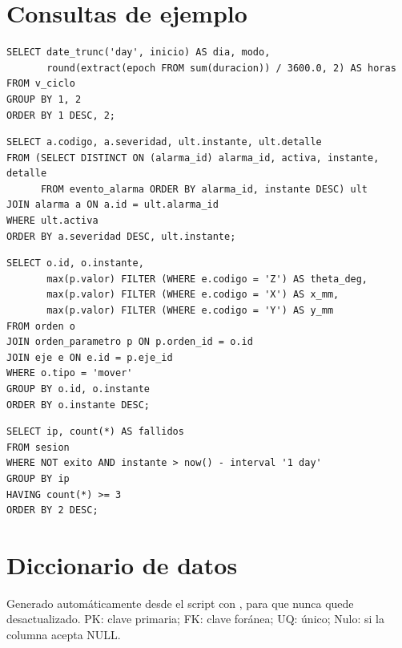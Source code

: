 \documentclass[a4paper,11pt]{article}
\begin{document}
\section{Consultas de ejemplo}\label{sec:consultas}

\begin{lstlisting}[style=sql, caption={Tiempo encendido por día y por modo (consulta 2).}]
SELECT date_trunc('day', inicio) AS dia, modo,
       round(extract(epoch FROM sum(duracion)) / 3600.0, 2) AS horas
FROM v_ciclo
GROUP BY 1, 2
ORDER BY 1 DESC, 2;
\end{lstlisting}

\begin{lstlisting}[style=sql, caption={Alarmas activas en este momento (consulta 11).}]
SELECT a.codigo, a.severidad, ult.instante, ult.detalle
FROM (SELECT DISTINCT ON (alarma_id) alarma_id, activa, instante, detalle
      FROM evento_alarma ORDER BY alarma_id, instante DESC) ult
JOIN alarma a ON a.id = ult.alarma_id
WHERE ult.activa
ORDER BY a.severidad DESC, ult.instante;
\end{lstlisting}

\begin{lstlisting}[style=sql, caption={La 1FN se deshace solo al mostrar: destinos de cada orden en una fila (consulta 14).}]
SELECT o.id, o.instante,
       max(p.valor) FILTER (WHERE e.codigo = 'Z') AS theta_deg,
       max(p.valor) FILTER (WHERE e.codigo = 'X') AS x_mm,
       max(p.valor) FILTER (WHERE e.codigo = 'Y') AS y_mm
FROM orden o
JOIN orden_parametro p ON p.orden_id = o.id
JOIN eje e ON e.id = p.eje_id
WHERE o.tipo = 'mover'
GROUP BY o.id, o.instante
ORDER BY o.instante DESC;
\end{lstlisting}

\begin{lstlisting}[style=sql, caption={Seguridad: IP con tres o más ingresos fallidos en el último día (consulta 10).}]
SELECT ip, count(*) AS fallidos
FROM sesion
WHERE NOT exito AND instante > now() - interval '1 day'
GROUP BY ip
HAVING count(*) >= 3
ORDER BY 2 DESC;
\end{lstlisting}

\section{Diccionario de datos}\label{sec:diccionario}
Generado automáticamente desde el script con , para que nunca quede desactualizado. PK: clave primaria; FK: clave foránea; UQ: único; Nulo: si la columna acepta NULL.
{\small

}
\end{document}
